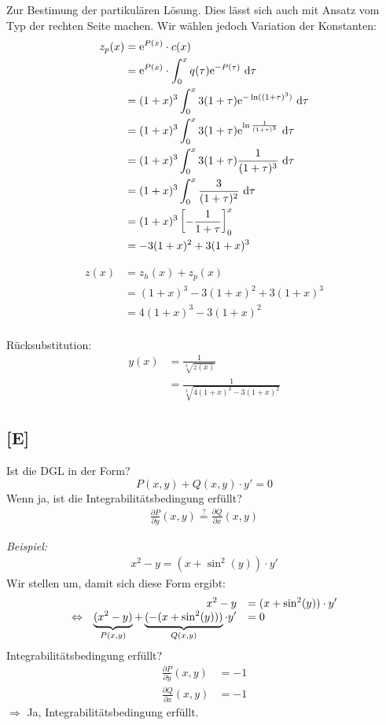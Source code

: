 \documentclass[main.tex]{subfiles}
\begin{document}
Zur Bestimung der partikulären Lösung. Dies lässt sich auch mit Ansatz vom Typ der rechten Seite machen. Wir wählen jedoch Variation der Konstanten: 
\begin{align*}
	z_p(x) &= \mathrm{e}^{P(x)} \cdot c(x)\\
		   &= \mathrm{e}^{P(x)} \cdot \int_0^x q(\tau)\mathrm{e}^{-P(\tau)} ~\mathrm{d}\tau\\
		   &= (1+x)^3 \int_0^x 3(1+\tau) \mathrm{e}^{-\ln((1+\tau)^3)} ~\mathrm{d}\tau \\
		   &= (1+x)^3 \int_0^x 3(1+\tau) \mathrm{e}^{\ln\frac{1}{(1+\tau)^3}} ~\mathrm{d}\tau \\
		   &= (1+x)^3 \int_0^x 3(1+\tau) \frac{1}{(1+\tau)^3} ~\mathrm{d}\tau \\
		   &= (1+x)^3 \int_0^x \frac{3}{(1+\tau)^2} ~\mathrm{d}\tau \\
		   &= (1+x)^3 \left[ - \frac{1}{1+\tau} \right]_0^x \\
		   &= -3(1+x)^2 + 3(1+x)^3 \\
\end{align*}

\begin{align*}
	z(x) &= z_h(x) + z_p(x) \\
		 &= (1+x)^3 -3(1+x)^2 + 3(1+x)^3 \\
		 &= 4(1+x)^3 -3(1+x)^2 \\
\end{align*}

Rücksubstitution:
\begin{align*}
	y(x) &= \frac{1}{\sqrt[3]{z(x)}} \\
		 &= \frac{1}{\sqrt[3]{4(1+x)^3 -3(1+x)^2}}
\end{align*}

\subsection{[E]}
Ist die DGL in der Form?
$$
	P(x,y) + Q(x,y)\cdot y' = 0
$$
Wenn ja, ist die Integrabilitätsbedingung erfüllt?
\begin{align*}
	\frac{\partial P}{\partial y} (x,y) \overset{?}{=} \frac{\partial Q}{\partial x}(x,y)
\end{align*}

\textit{Beispiel:}\\
\begin{align*}
	x^2 -y = (x + \sin^2(y))\cdot y'
\end{align*}
Wir stellen um, damit sich diese Form ergibt: 
\[\everymath={\displaystyle}\begin{array}{crl}
				& x^2 -y &= (x + \sin^2(y)) \cdot y' \\
\Leftrightarrow & \underbrace{(x^2 -y)}_{P(x,y)} + \underbrace{(-(x+\sin^2(y)))}_{Q(x,y)} \cdot y' & = 0 \\
\end{array}\]
Integrabilitätsbedingung erfüllt?
\begin{align*}
	\frac{\partial P}{\partial y}(x,y) &= -1 \\
	\frac{\partial Q}{\partial x}(x,y) &= -1 
\end{align*}
$\Rightarrow$ Ja, Integrabilitätsbedingung erfüllt.
\end{document}
